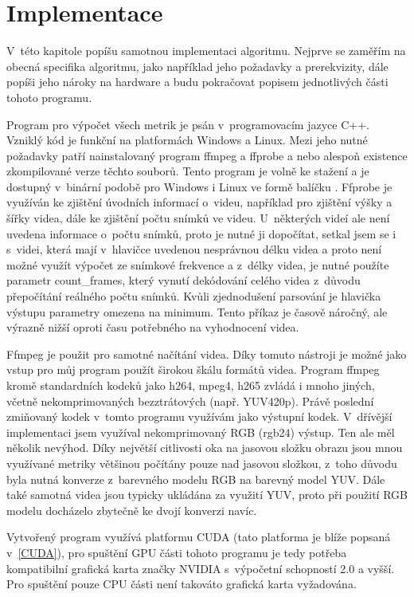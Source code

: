 \documentclass[thesis=M,czech]{FITthesis}[2016/06/26]
\begin{document}
\chapter{Implementace}
V~této kapitole popíšu samotnou implementaci algoritmu. Nejprve se zaměřím na obecná specifika algoritmu, jako například jeho požadavky a prerekvizity, dále popíši jeho nároky na hardware a budu pokračovat popisem jednotlivých části tohoto programu. 

Program pro výpočet všech metrik je psán v~programovacím jazyce C++. Vzniklý kód je funkční na platformách Windows a Linux. Mezi jeho nutné požadavky patří nainstalovaný program ffmpeg a ffprobe\cite{ffmpeg} a nebo alespoň existence zkompilované verze těchto souborů. Tento program je volně ke stažení a je dostupný v~binární podobě pro Windows \cite{ffmpeg_windows} i Linux ve formě balíčku \cite{ffmpeg_linux}. Ffprobe je využíván ke zjištění úvodních informací o~videu, například pro zjištění výšky a šířky videa, dále ke zjištění počtu snímků ve videu. U~některých videí ale není uvedena informace o~počtu snímků, proto je nutné ji dopočítat, setkal jsem se i s~videi, která mají v~hlavičce uvedenou nesprávnou délku videa a proto není možné využít výpočet ze snímkové frekvence a z~délky videa, je nutné použíte parametr count\_frames, který vynutí dekódování celého videa z~důvodu přepočítání reálného počtu snímků. Kvůli zjednodušení parsování je hlavička výstupu parametry omezena na minimum. Tento příkaz je časově náročný, ale výrazně nižší oproti času potřebného na vyhodnocení videa.


Ffmpeg je použit pro samotné načítání videa. Díky tomuto nástroji je možné jako vstup pro můj program použít širokou škálu formátů videa. Program ffmpeg kromě standardních kodeků jako h264, mpeg4, h265 zvládá i mnoho jiných, včetně nekomprimovaných bezztrátových (např. YUV420p). Právě poslední zmiňovaný kodek v~tomto programu využívám jako výstupní kodek. V~dřívější implementaci jsem využíval nekomprimovaný RGB (rgb24) výstup. Ten ale měl několik nevýhod. Díky největší citlivosti oka na jasovou složku obrazu jsou mnou využívané metriky většinou počítány pouze nad jasovou složkou, z~toho důvodu byla nutná konverze z~barevného modelu RGB na barevný model YUV. Dále také samotná videa jsou typicky ukládána za využití YUV, proto při použití RGB modelu docházelo zbytečně ke dvojí konverzi navíc.

Vytvořený program využívá platformu CUDA (tato platforma je blíže popsaná v~\autoref{CUDA}), pro spuštění GPU části tohoto programu je tedy potřeba kompatibilní grafická karta značky NVIDIA s~výpočetní schopností 2.0 a vyšší. Pro spuštění pouze CPU části není takováto grafická karta vyžadována.
\end{document}
